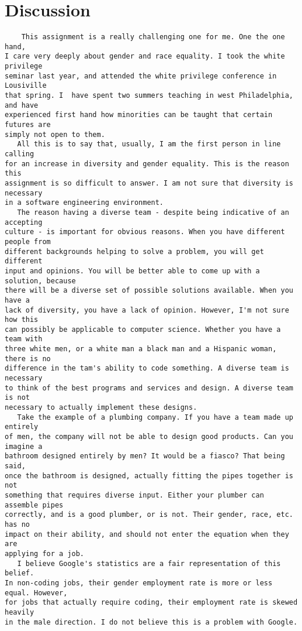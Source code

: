 \documentclass{article}
\begin{document}
	\section{Discussion}
	\begin{verbatim}
    This assignment is a really challenging one for me. One the one hand,
I care very deeply about gender and race equality. I took the white privilege
seminar last year, and attended the white privilege conference in Lousiville 
that spring. I  have spent two summers teaching in west Philadelphia, and have
experienced first hand how minorities can be taught that certain futures are
simply not open to them. 
   All this is to say that, usually, I am the first person in line calling
for an increase in diversity and gender equality. This is the reason this 
assignment is so difficult to answer. I am not sure that diversity is necessary 
in a software engineering environment. 
   The reason having a diverse team - despite being indicative of an accepting
culture - is important for obvious reasons. When you have different people from
different backgrounds helping to solve a problem, you will get different 
input and opinions. You will be better able to come up with a solution, because
there will be a diverse set of possible solutions available. When you have a 
lack of diversity, you have a lack of opinion. However, I'm not sure how this
can possibly be applicable to computer science. Whether you have a team with 
three white men, or a white man a black man and a Hispanic woman, there is no 
difference in the tam's ability to code something. A diverse team is necessary
to think of the best programs and services and design. A diverse team is not 
necessary to actually implement these designs. 
   Take the example of a plumbing company. If you have a team made up entirely
of men, the company will not be able to design good products. Can you imagine a 
bathroom designed entirely by men? It would be a fiasco? That being said,
once the bathroom is designed, actually fitting the pipes together is not 
something that requires diverse input. Either your plumber can assemble pipes
correctly, and is a good plumber, or is not. Their gender, race, etc. has no 
impact on their ability, and should not enter the equation when they are 
applying for a job.
   I believe Google's statistics are a fair representation of this belief.
In non-coding jobs, their gender employment rate is more or less equal. However,
for jobs that actually require coding, their employment rate is skewed heavily
in the male direction. I do not believe this is a problem with Google. 

\end{verbatim}
\end{document}
